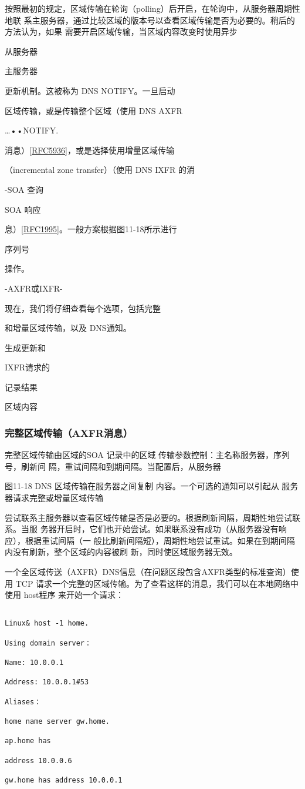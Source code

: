 按照最初的规定，区域传输在轮询（polling）后开启，在轮询中，从服务器周期性地联
系主服务器，通过比较区域的版本号以查看区域传输是否为必要的。稍后的方法认为，如果
需要开启区域传输，当区域内容改变时使用异步

从服务器

主服务器

更新机制。这被称为 DNS NOTIFY。一旦启动

区域传输，或是传输整个区域（使用 DNS AXFR

…••NOTIFY.

消息）\href{https://www.rfc-editor.org/rfc/rfc5936}{[RFC5936]}，或是选择使用增量区域传输

（incremental zone transfer）（使用 DNS IXFR 的消

-SOA 查询

SOA 响应

息）\href{https://www.rfc-editor.org/rfc/rfc1995}{[RFC1995]}。一般方案根据图11-18所示进行

序列号

操作。

-AXFR或IXFR-

现在，我们将仔细查看每个选项，包括完整

和增量区域传输，以及 DNS通知。

生成更新和

IXFR请求的

记录结果

区域内容

\subsubsection{完整区域传输（AXFR消息）}

完整区域传输由区域的SOA 记录中的区域
传输参数控制：主名称服务器，序列号，刷新间
隔，重试间隔和到期间隔。当配置后，从服务器

图11-18
DNS 区域传输在服务器之间复制
内容。一个可选的通知可以引起从
服务器请求完整或增量区域传输

尝试联系主服务器以查看区域传输是否是必要的。根据刷新间隔，周期性地尝试联系。当服
务器开启时，它们也开始尝试。如果联系没有成功（从服务器没有响应），根据重试间隔（一
般比刷新间隔短），周期性地尝试重试。如果在到期间隔内没有刷新，整个区域的内容被刷
新，同时使区域服务器无效。

一个全区域传送（AXFR）DNS信息（在问题区段包含AXFR类型的标准查询）使用
TCP 请求一个完整的区域传输。为了查看这样的消息，我们可以在本地网络中使用 host程序
来开始一个请求：

\begin{verbatim}
    
Linux& host -1 home.

Using domain server：

Name: 10.0.0.1

Address: 10.0.0.1#53

Aliases：

home name server gw.home.

ap.home has

address 10.0.0.6

gw.home has address 10.0.0.1
\end{verbatim}

